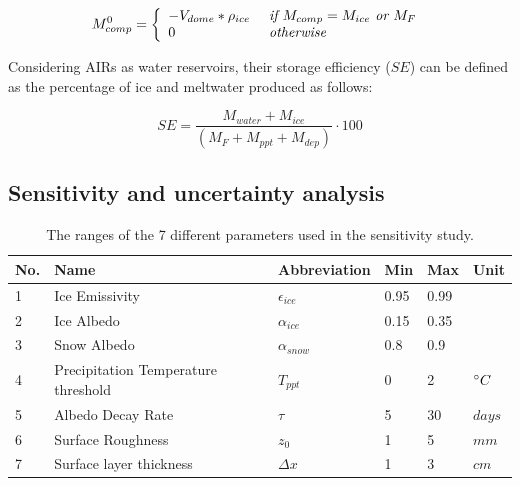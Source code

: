 \documentclass[utf8]{frontiersSCNS} %
\begin{document}
\begin{equation} M_{comp}^0 = \left\{ \begin{array}{ll} -V_{dome} * \rho_{ice} & \textit{ if } M_{comp}=
             M_{ice}\textit{ or }
             M_{F}                                                 \\ 0 & \textit{ otherwise }\\\end{array} \right. \\
\end{equation}

Considering AIRs as water reservoirs, their storage efficiency ($SE$) can be defined as the percentage of ice and
meltwater produced as follows:

\begin{equation} \textit{SE} = \frac{M_{water}+M_{ice}}{(M_F+M_{ppt}+M_{dep})} \cdot 100 \end{equation}


\subsection{Sensitivity and uncertainty analysis}

\begin{table}
	\centering
	\caption{The ranges of the 7 different parameters used in the sensitivity study.}
	\label{tab:parameters}
	\begin{tabular}{@{}llllll@{}}
		\toprule
		\textbf{No.} & \textbf{Name}                       & \textbf{Abbreviation} & \textbf{Min} & \textbf{Max} & \textbf{Unit} \\\midrule
		1            & Ice Emissivity                      & $\epsilon_{ice}$      & 0.95         & 0.99         &               \\
		2            & Ice Albedo                          & $\alpha_{ice}$        & 0.15         & 0.35         &               \\
		3            & Snow Albedo                         & $\alpha_{snow}$       & 0.8          & 0.9          &               \\
		4            & Precipitation Temperature threshold & $T_{ppt}$             & 0            & 2            & $\degree C$   \\
		5            & Albedo Decay Rate                   & $\tau$                & 5            & 30           & $days$        \\
		6            & Surface Roughness                   & $z_0$                 & 1            & 5            & $mm$          \\
		7            & Surface layer thickness             & $\Delta x$            & 1            & 3            & $cm$          \\\bottomrule
	\end{tabular}
\end{table}
\end{document}
